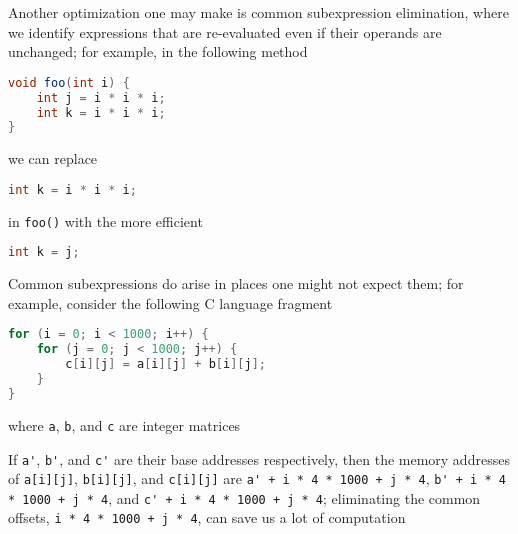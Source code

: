 \documentclass[8pt,a4paper,compress]{beamer}
\begin{document}
\begin{frame}[fragile]
\pause

Another optimization one may make is common subexpression elimination, where we identify expressions that are re-evaluated even if their operands are unchanged; for example, in the following method

\begin{lstlisting}[language=Java,style=focusin]
void foo(int i) {
    int j = i * i * i;
    int k = i * i * i;
}
\end{lstlisting}

we can replace

\begin{lstlisting}[language=Java,style=focusin]
int k = i * i * i;
\end{lstlisting}

in \lstinline{foo()} with the more efficient

\begin{lstlisting}[language=Java,style=focusin]
int k = j;
\end{lstlisting}

\pause
\bigskip

Common subexpressions do arise in places one might not expect them; for example, consider the following C language fragment
\begin{lstlisting}[language=C,style=focusin]
for (i = 0; i < 1000; i++) {
    for (j = 0; j < 1000; j++) {
        c[i][j] = a[i][j] + b[i][j];
    }
}
\end{lstlisting}
where \lstinline{a}, \lstinline{b}, and \lstinline{c} are integer matrices 

\pause
\bigskip

If \lstinline{a'}, \lstinline{b'}, and \lstinline{c'} are their base addresses respectively, then the memory addresses of \lstinline{a[i][j]}, \lstinline{b[i][j]}, and \lstinline{c[i][j]} are \lstinline{a' + i * 4 * 1000 + j * 4}, \lstinline{b' + i * 4 * 1000 + j * 4}, and \lstinline{c' + i * 4 * 1000 + j * 4}; eliminating the common offsets, \lstinline{i * 4 * 1000 + j * 4}, can save us a lot of computation
\end{frame}
\end{document}
